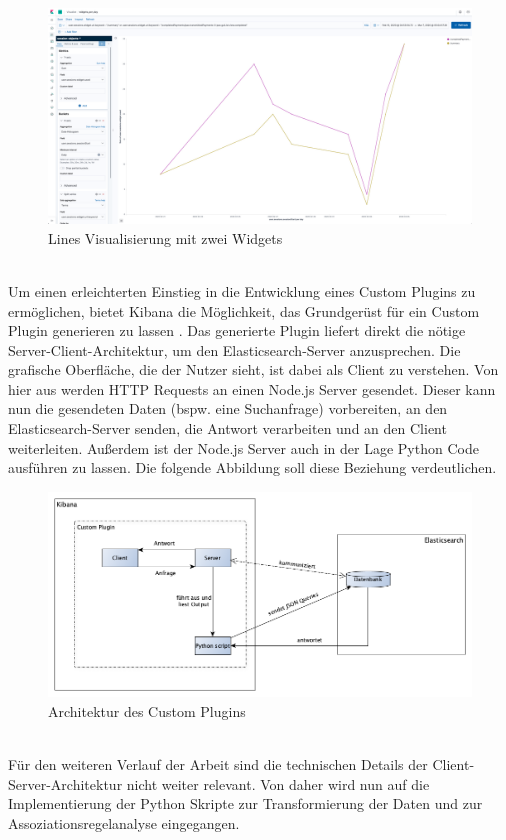 \begin{figure}[htb]
\begin{center}
	\includegraphics[width=430pt]{bilder/screen_lines.png}
\end{center}
\caption{Lines Visualisierung mit zwei Widgets}
\label{fig:screen_lines}
\end{figure}

\\
Um einen erleichterten Einstieg in die Entwicklung eines Custom Plugins zu ermöglichen, bietet Kibana die Möglichkeit, das Grundgerüst für ein Custom Plugin generieren zu lassen \citep{KibPlug20}. Das generierte Plugin liefert direkt die nötige Server-Client-Architektur, um den Elasticsearch-Server anzusprechen. Die grafische Oberfläche, die der Nutzer sieht, ist dabei als Client zu verstehen. Von hier aus werden HTTP Requests an einen Node.js Server gesendet. Dieser kann nun die gesendeten Daten (bspw. eine Suchanfrage) vorbereiten, an den Elasticsearch-Server senden, die Antwort verarbeiten und an den Client weiterleiten. Außerdem ist der Node.js Server auch in der Lage Python Code ausführen zu lassen. Die folgende Abbildung soll diese Beziehung verdeutlichen. 
\begin{figure}[htb]
\begin{center}
	\includegraphics[width=430pt]{bilder/custom_plugin.png}
\end{center}
\caption{Architektur des Custom Plugins}
\label{fig:custom_plugin}
\end{figure}\\
Für den weiteren Verlauf der Arbeit sind die technischen Details der Client-Server-Architektur nicht weiter relevant. Von daher wird nun auf die Implementierung der Python Skripte zur Transformierung der Daten und zur Assoziationsregelanalyse eingegangen.


